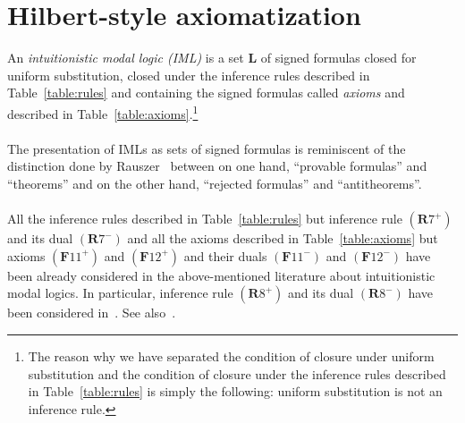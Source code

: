 \documentclass[draft]{article}
\def\Formula{\mathbf{A}}
\def\Formula{\mathbf{F}}
\def\Rule{\mathbf{R}}
\def\L{\mathbf{L}}
\begin{document}
\section{Hilbert-style axiomatization}\label{section:hilbert:style:axiomatization}
%
%
An {\em intuitionistic modal logic (IML)}\/ is a set $\L$ of signed formulas closed for uniform substitution, closed under the inference rules described in Table~\ref{table:rules} and containing the signed formulas called {\em axioms}\/ and described in Table~\ref{table:axioms}.\footnote{The reason why we have separated the condition of closure under uniform substitution and the condition of closure under the inference rules described in Table~\ref{table:rules} is simply the following: uniform substitution is not an inference rule.}
%
%
\\
\\
%
%
The presentation of IMLs as sets of signed formulas is reminiscent of the distinction done by Rauszer~\cite{Rauszer:1980} between on one hand, ``provable formulas'' and ``theorems'' and on the other hand, ``rejected formulas'' and ``antitheorems''.
%
%
\\
\\
%
%
All the inference rules described in Table~\ref{table:rules} but inference rule $(\Rule7^{+})$ and its dual $(\Rule7^{-})$ and all the axioms described in Table~\ref{table:axioms} but axioms $(\Formula11^{+})$ and $(\Formula12^{+})$ and their duals $(\Formula11^{-})$ and $(\Formula12^{-})$ have been already considered in the above-mentioned literature about intuitionistic modal logics.
In particular, inference rule $(\Rule8^{+})$ and its dual $(\Rule8^{-})$ have been considered in~\cite{Prenosil:2014}.
See also~\cite{Balbiani:Gencer:preliminary:draft:SL}.
%
%
\end{document}
